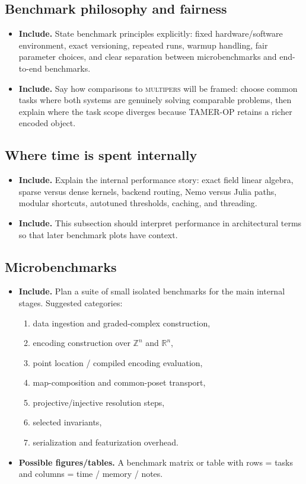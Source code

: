 \documentclass[11pt]{article}
\newcommand{\R}{\mathbb{R}}
\newcommand{\Z}{\mathbb{Z}}
\newcommand{\TAMER}{\textsc{TAMER-OP}}
\newcommand{\multipers}{\textsc{multipers}}
\newenvironment{plan}{\begin{itemize}[leftmargin=1.6em,itemsep=0.35em,topsep=0.25em]}{\end{itemize}}
\newcommand{\includeitems}[1]{\item \textbf{Include.} #1}
\newcommand{\figures}[1]{\item \textbf{Possible figures/tables.} #1}
\begin{document}
\subsection{Benchmark philosophy and fairness}

\begin{plan}
    \includeitems{State benchmark principles explicitly: fixed hardware/software environment, exact versioning, repeated runs, warmup handling, fair parameter choices, and clear separation between microbenchmarks and end-to-end benchmarks.}
    \includeitems{Say how comparisons to \multipers{} will be framed: choose common tasks where both systems are genuinely solving comparable problems, then explain where the task scope diverges because \TAMER{} retains a richer encoded object.}
\end{plan}

\subsection{Where time is spent internally}

\begin{plan}
    \includeitems{Explain the internal performance story: exact field linear algebra, sparse versus dense kernels, backend routing, Nemo versus Julia paths, modular shortcuts, autotuned thresholds, caching, and threading.}
    \includeitems{This subsection should interpret performance in architectural terms so that later benchmark plots have context.}
\end{plan}

\subsection{Microbenchmarks}

\begin{plan}
    \includeitems{Plan a suite of small isolated benchmarks for the main internal stages. Suggested categories:
    \begin{enumerate}[label=(\alph*)]
        \item data ingestion and graded-complex construction,
        \item encoding construction over $\Z^n$ and $\R^n$,
        \item point location / compiled encoding evaluation,
        \item map-composition and common-poset transport,
        \item projective/injective resolution steps,
        \item selected invariants,
        \item serialization and featurization overhead.
    \end{enumerate}}
    \figures{A benchmark matrix or table with rows = tasks and columns = time / memory / notes.}
\end{plan}
\end{document}
